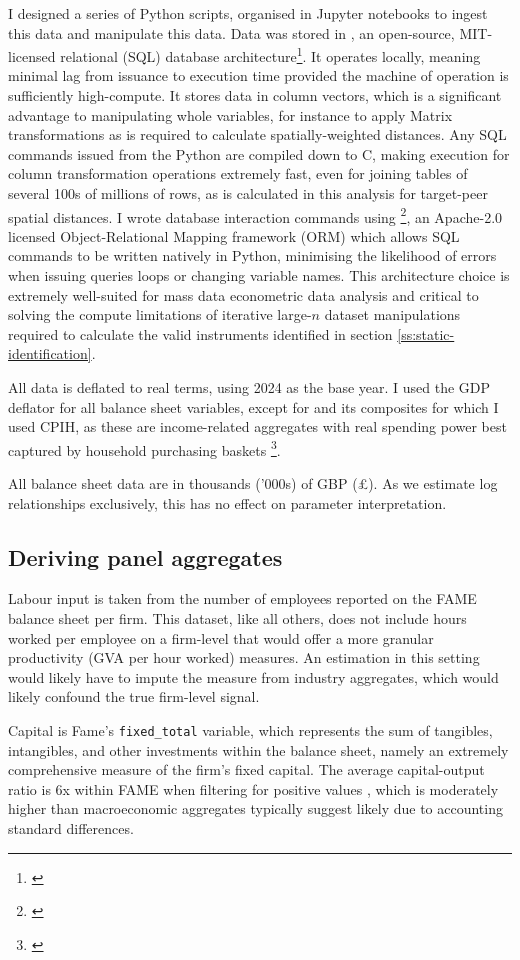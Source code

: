 I designed a series of Python scripts, organised in Jupyter notebooks to ingest this data and manipulate this data.
Data was stored in , an open-source, MIT-licensed relational (SQL) database architecture\footnote{\cite{Raasveldt2026}}.
It operates locally, meaning minimal lag from issuance to execution time
provided the machine of operation is sufficiently high-compute.
It stores data in column vectors, which is a significant advantage
to manipulating whole variables, for instance to apply Matrix transformations
as is required to calculate spatially-weighted distances.
Any SQL commands issued from the Python are compiled down to C,
making execution for column transformation operations extremely fast,
even for joining tables of several 100s of millions of rows,
as is calculated in this analysis for target-peer spatial distances.
I wrote database interaction commands using \footnote{\cite{TheIbisProjectAuthors2026}}, an Apache-2.0 licensed 
Object-Relational Mapping framework (ORM) which allows SQL commands to be written natively in Python,
minimising the likelihood of errors when issuing queries loops or changing variable names.
This architecture choice is extremely well-suited for mass data econometric data analysis
and critical to solving the compute limitations of iterative large-$n$ dataset manipulations
required to calculate the valid instruments identified in section \ref{ss:static-identification}.

\todo{\dots}

All data is deflated to real terms, using 2024 as the base year.
I used the GDP deflator for all balance sheet variables,
except for  and its composites for which I used CPIH,
as these are income-related aggregates with real spending power best captured by household purchasing baskets
\footnote{\cite{OfficeforNationalStatistics2026}}.
\par
All balance sheet data are in thousands ('000s) of GBP (£).
As we estimate log relationships exclusively, this has no effect on parameter interpretation.

\subsection{Deriving panel aggregates}

Labour input is taken from the number of employees reported on the FAME balance sheet per firm.
This dataset, like all others, does not include hours worked per employee on a firm-level that would offer a more
granular productivity (GVA per hour worked) measures. An estimation in this setting would likely have to impute the measure
from industry aggregates, which would likely confound the true firm-level signal.
\par
Capital is Fame's \texttt{fixed\_total} variable, which represents the sum of tangibles, intangibles, and other investments
within the balance sheet, namely an extremely comprehensive measure of the firm's fixed capital.
The average capital-output ratio is 6x within FAME when filtering for positive values ,
which is moderately higher than macroeconomic aggregates typically suggest
likely due to accounting standard differences.

